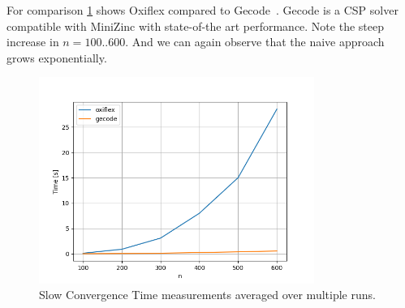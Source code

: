 For comparison \cref{fig:slow:gecode} shows Oxiflex compared to Gecode~\cite{gecode}. Gecode is a CSP solver compatible with MiniZinc with state-of-the art performance. Note the steep increase in $n = 100..600$. And we can again observe that the naive approach grows exponentially.

\begin{figure}[ht]
	\centering
	\includegraphics[width=0.8\textwidth]{./Problems/slow_convergence/plots/gecode.png}
	\caption{Slow Convergence Time measurements averaged over multiple runs.}
	\label{fig:slow:gecode}
\end{figure}
